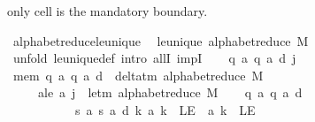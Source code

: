 \begin{isabellebody}
\begin{isamarkuptext}
  only  cell is the mandatory boundary.%
\end{isamarkuptext}\isamarkuptrue%
\isamarkupfalse%
\ alphabet{\isacharunderscore}{\kern0pt}reduce{\isacharunderscore}{\kern0pt}le{\isacharunderscore}{\kern0pt}unique{\isacharcolon}{\kern0pt}\isanewline
\ \ {\isachardoublequoteopen}le{\isacharunderscore}{\kern0pt}unique\ {\isacharparenleft}{\kern0pt}alphabet{\isacharunderscore}{\kern0pt}reduce\ M{\isacharparenright}{\kern0pt}{\isachardoublequoteclose}\isanewline
%
\isadelimproof
%
\endisadelimproof
%
\isatagproof
{}\isamarkupfalse%
\ {\isacharparenleft}{\kern0pt}unfold\ le{\isacharunderscore}{\kern0pt}unique{\isacharunderscore}{\kern0pt}def{\isacharcomma}{\kern0pt}\ intro\ allI\ impI{\isacharparenright}{\kern0pt}\isanewline
\ \ \isamarkupfalse%
\ q\ a\ q{\isacharprime}{\kern0pt}\ a{\isacharprime}{\kern0pt}\ d\ j\isanewline
\ \ \isamarkupfalse%
\ mem{\isacharcolon}{\kern0pt}\ {\isachardoublequoteopen}{\isacharparenleft}{\kern0pt}q{\isacharcomma}{\kern0pt}\ a{\isacharcomma}{\kern0pt}\ q{\isacharprime}{\kern0pt}{\isacharcomma}{\kern0pt}\ a{\isacharprime}{\kern0pt}{\isacharcomma}{\kern0pt}\ d{\isacharparenright}{\kern0pt}\ {\isasymin}\ delta{\isacharunderscore}{\kern0pt}tm\ {\isacharparenleft}{\kern0pt}alphabet{\isacharunderscore}{\kern0pt}reduce\ M{\isacharparenright}{\kern0pt}{\isachardoublequoteclose}\isanewline
\ \ \ \ \ a{\isacharprime}{\kern0pt}le{\isacharcolon}{\kern0pt}\ {\isachardoublequoteopen}a{\isacharprime}{\kern0pt}\ j\ {\isacharequal}{\kern0pt}\ le{\isacharunderscore}{\kern0pt}tm\ {\isacharparenleft}{\kern0pt}alphabet{\isacharunderscore}{\kern0pt}reduce\ M{\isacharparenright}{\kern0pt}{\isachardoublequoteclose}\isanewline
\ \ \isamarkupfalse%
\ {\isachardoublequoteopen}{\isacharparenleft}{\kern0pt}q{\isacharcomma}{\kern0pt}\ a{\isacharcomma}{\kern0pt}\ q{\isacharprime}{\kern0pt}{\isacharcomma}{\kern0pt}\ a{\isacharprime}{\kern0pt}{\isacharcomma}{\kern0pt}\ d{\isacharparenright}{\kern0pt}\isanewline
\ \ \ \ \ \ \ \ \ \ {\isasymin}\ {\isacharbraceleft}{\kern0pt}{\isacharparenleft}{\kern0pt}s{\isacharcomma}{\kern0pt}\ a{\isacharcomma}{\kern0pt}\ s{\isacharprime}{\kern0pt}{\isacharcomma}{\kern0pt}\ a{\isacharprime}{\kern0pt}{\isacharcomma}{\kern0pt}\ d{\isacharparenright}{\kern0pt}{\isachardot}{\kern0pt}\ {\isasymforall}k{\isachardot}{\kern0pt}\ a{\isacharprime}{\kern0pt}\ k\ {\isacharequal}{\kern0pt}\ LE{}\ {\isasymlongrightarrow}\ a\ k\ {\isacharequal}{\kern0pt}\ LE{}{\isacharbraceright}{\kern0pt}{\isachardoublequoteclose}\isanewline

\end{isabellebody}
